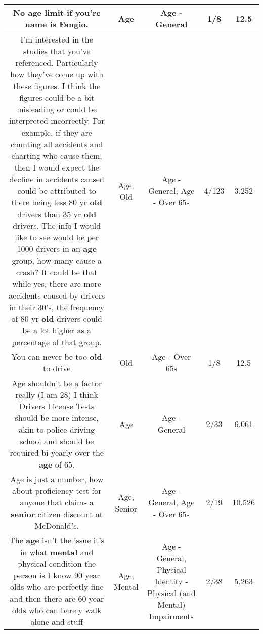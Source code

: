 \documentclass[11pt]{article}
\newlength\mylength
\begin{document}
\begin{center}
\begin{longtable}{|C{.65\mylength}|C{.30\mylength}|C{.12\mylength}|C{.12\mylength}|C{.12\mylength}|}
  \small No \textbf{age} limit if you're name is Fangio.\normalsize   & Age & Age - General & 1/8 & 12.5 \\  \hline
  \small I'm interested in the studies that you've referenced.  Particularly how they've come up with these figures.  I think the figures could be a bit misleading or could be interpreted incorrectly.    For example, if they are counting all accidents and charting who cause them, then I would expect the decline in accidents caused could be attributed to there being less 80 yr \textbf{old} drivers than 35 yr \textbf{old} drivers.  The info I would like to see would be per 1000 drivers in an \textbf{age} group, how many cause a crash? It could be that while yes, there are more accidents caused by drivers in their 30's, the frequency of 80 yr \textbf{old} drivers could be a lot higher as a percentage of that group.\normalsize   & Age, Old & Age - General, Age - Over 65s & 4/123 & 3.252 \\  \hline
  \small You can never be too \textbf{old} to drive\normalsize   & Old & Age - Over 65s & 1/8 & 12.5 \\  \hline
  \small Age shouldn't be a factor really (I am 28) I think Drivers License Tests should be more intense, akin to police driving school and should be required bi-yearly over the \textbf{age} of 65.\normalsize   & Age & Age - General & 2/33 & 6.061 \\  \hline
  \small Age is just a number, how about proficiency test for anyone that claims a \textbf{senior} citizen discount at McDonald's.\normalsize   & Age, Senior & Age - General, Age - Over 65s & 2/19 & 10.526 \\  \hline
  \small The \textbf{age} isn't the issue it's in what \textbf{mental} and physical condition the person is I know 90 year olds who are perfectly fine and then there are 60 year olds who can barely walk alone and stuff\normalsize   & Age, Mental & Age - General, Physical Identity - Physical (and Mental) Impairments & 2/38 & 5.263 \\  \hline

\end{longtable}
\end{center}
\end{document}
